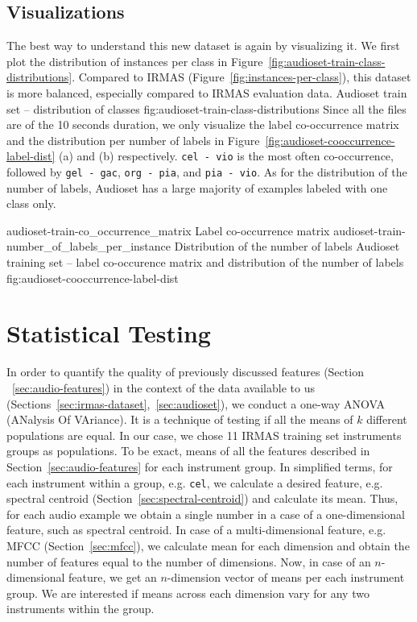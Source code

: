 \subsection{Visualizations}
\label{sec:audioset:visualizations}
The best way to understand this new dataset is again by visualizing it. We first plot the distribution of instances per class in Figure~\ref{fig:audioset-train-class-distributions}.
Compared to IRMAS (Figure~\ref{fig:instances-per-class}), this dataset is more balanced, especially compared to IRMAS evaluation data. 
	        {Audioset train set -- distribution of classes}
                {fig:audioset-train-class-distributions}
Since all the files are of the 10 seconds duration, we only visualize the label co-occurrence matrix and the distribution per number of labels in Figure~\ref{fig:audioset-cooccurrence-label-dist} (a) and (b) respectively. \texttt{cel - vio} is the most often co-occurrence, followed by \texttt{gel - gac}, \texttt{org - pia}, and \texttt{pia - vio}. As for the distribution of the number of labels, Audioset has a large majority of examples labeled with one class only. 

\asideimages{8cm}{6.5cm}
	    {audioset-train-co_occurrence_matrix}
	    {Label co-occurrence matrix}
            {audioset-train-number_of_labels_per_instance}
	    {Distribution of the number of labels}
	    {Audioset training set -- label co-occurence matrix and distribution of the number of labels}
	    {fig:audioset-cooccurrence-label-dist}


\section{Statistical Testing}
\label{sec:statistical-testing}
In order to quantify the quality of previously discussed features (Section ~\ref{sec:audio-features}) in the context of the data available to us (Sections~\ref{sec:irmas-dataset},~\ref{sec:audioset}), we conduct a one-way ANOVA (ANalysis Of VAriance). It is a technique of testing if all the means of $k$ different populations are equal. In our case, we chose 11 IRMAS training set instruments groups as populations. To be exact, means of all the features described in Section~\ref{sec:audio-features} for each instrument group. In simplified terms, for each instrument within a group, e.g. \texttt{cel}, we calculate a desired feature, e.g. spectral centroid (Section~\ref{sec:spectral-centroid}) and calculate its mean. Thus, for each audio example we obtain a single number in a case of a one-dimensional feature, such as spectral centroid. In case of a multi-dimensional feature, e.g. MFCC (Section~\ref{sec:mfcc}), we calculate mean for each dimension and obtain the number of features equal to the number of dimensions. Now, in case of an $n$-dimensional feature, we get an $n$-dimension vector of means per each instrument group. We are interested if means across each dimension vary for any two instruments within the group.

